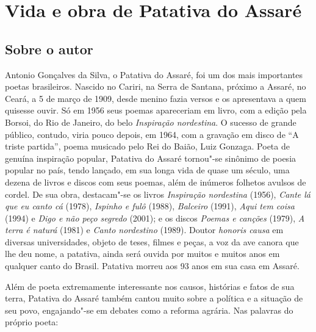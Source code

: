 \chapter{Vida e obra de Patativa do Assaré}

\section{Sobre o autor}

\noindent{}Antonio Gonçalves da Silva, o Patativa do Assaré, foi um dos mais importantes
poetas brasileiros. Nascido no Cariri, na Serra de Santana, próximo a Assaré,
no Ceará, a 5 de março de 1909, desde menino fazia versos e os apresentava a
quem quisesse ouvir. Só em 1956 seus poemas apareceriam em livro, com a edição
pela Borsoi, do Rio de Janeiro, do belo \textit{Inspiração nordestina}. O
sucesso de grande público, contudo, viria pouco depois, em 1964, com a gravação
em disco de ``A triste partida'', poema musicado pelo Rei do Baião, Luiz
Gonzaga. Poeta de genuína inspiração popular, Patativa do Assaré tornou"-se
sinônimo de poesia popular no país, tendo lançado, em sua longa vida de quase
um século, uma dezena de livros e discos com seus poemas, além de inúmeros
folhetos avulsos de cordel. De sua obra, destacam"-se os livros
\textit{Inspiração nordestina} (1956), \textit{Cante lá que eu canto cá}
(1978), \textit{Ispinho e fulô} (1988), \textit{Balceiro} (1991), \textit{Aqui
tem coisa} (1994) e \textit{Digo e não peço segredo} (2001); e os discos
\textit{Poemas e canções} (1979), \textit{A terra é naturá} (1981) e
\textit{Canto nordestino} (1989). Doutor \textit{honoris causa} em diversas
universidades, objeto de teses, filmes e peças, a voz da ave canora que lhe deu
nome, a patativa, ainda será ouvida por muitos e muitos anos em qualquer canto
do Brasil. Patativa morreu aos 93 anos em sua casa em Assaré.

Além de poeta extremamente interessante nos causos, histórias e fatos de sua terra, Patativa do Assaré também cantou muito sobre a política e a situação de seu povo, engajando"-se em debates como a reforma agrária.
Nas palavras do próprio poeta:

